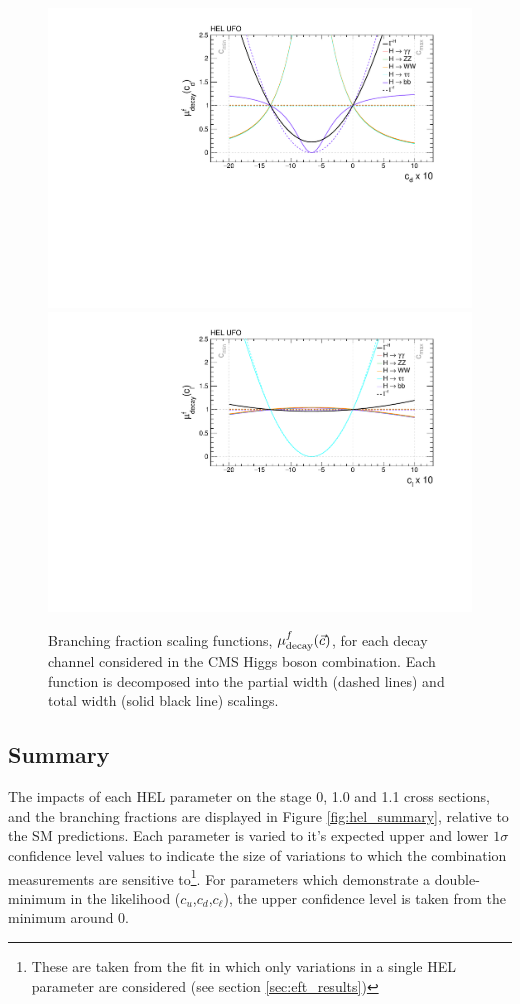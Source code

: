 \begin{figure}[htb!]
  \includegraphics[width=.49\textwidth]{Figures/eft/scaling_functions/decay_vs_cd.pdf}
  \includegraphics[width=.49\textwidth]{Figures/eft/scaling_functions/decay_vs_cl.pdf}
  \caption[HEL branching fraction scaling functions]
  {
    Branching fraction scaling functions, $\mu_{\rm{decay}}^f(\vec{c})$, for each decay channel considered in the CMS Higgs boson combination. Each function is decomposed into the partial width (dashed lines) and total width (solid black line) scalings.
  }
  \label{fig:eft_decay}
\end{figure}

\subsection{Summary}
The impacts of each HEL parameter on the stage 0, 1.0 and 1.1 cross sections, and the branching fractions are displayed in Figure \ref{fig:hel_summary}, relative to the SM predictions. Each parameter is varied to it's expected upper and lower $1\sigma$ confidence level values to indicate the size of variations to which the combination measurements are sensitive to\footnote{These are taken from the fit in which only variations in a single HEL parameter are considered (see section \ref{sec:eft_results})}. For parameters which demonstrate a double-minimum in the likelihood ($c_u$,$c_d$,$c_\ell$), the upper confidence level is taken from the minimum around 0. 

